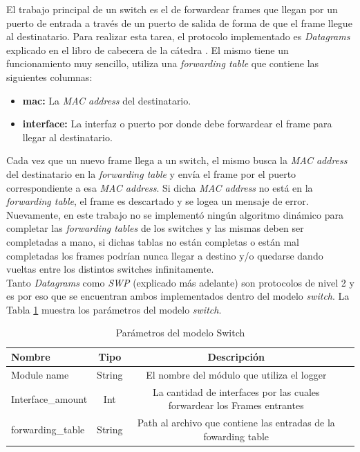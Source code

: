 \documentclass[10pt,a4paper]{article}
\begin{document}
El trabajo principal de un switch es el de forwardear frames que llegan por un puerto de entrada a través de un puerto de salida de forma de que el frame llegue al destinatario. Para realizar esta tarea, el protocolo implementado es \textit{Datagrams} explicado en el libro de cabecera de la cátedra \cite[p.~172]{peterson2011computer}. El mismo tiene un funcionamiento muy sencillo, utiliza una \textit{forwarding table} que contiene las siguientes columnas: \\

\begin{itemize}
\item \textbf{mac: } La \textit{MAC address} del destinatario.
\item \textbf{interface: } La interfaz o puerto por donde debe forwardear el frame para llegar al destinatario.
\end{itemize}

Cada vez que un nuevo frame llega a un switch, el mismo busca la \textit{MAC address} del destinatario en la \textit{forwarding table} y envía el frame por el puerto correspondiente a esa \textit{MAC address}. Si dicha \textit{MAC address} no está en la \textit{forwarding table}, el frame es descartado y se logea un mensaje de error. \\

Nuevamente, en este trabajo no se implementó ningún algoritmo dinámico para completar las \textit{forwarding tables} de los switches y las mismas deben ser completadas a mano, si dichas tablas no están completas o están mal completadas los frames podrían nunca llegar a destino y/o quedarse dando vueltas entre los distintos switches infinitamente. \\

Tanto \textit{Datagrams} como \textit{SWP} (explicado más adelante) son protocolos de nivel 2 y es por eso que se encuentran ambos implementados dentro del modelo \textit{switch}. La Tabla \ref{table: parameters datagrams} muestra los parámetros del modelo \textit{switch}.

\begin{table}[h]
\begin{tabular}{|l|c|c|c|}
  \hline
  \textbf{Nombre} & \textbf{Tipo} & \textbf{Descripción} \\
  \hline
  Module name & String & El nombre del módulo que utiliza el logger \\
  \hline
  Interface\_amount & Int & La cantidad de interfaces por las cuales forwardear los Frames entrantes \\
  \hline
  forwarding\_table & String & Path al archivo que contiene las entradas de la fowarding table \\
  \hline
\end{tabular}
\caption{Parámetros del modelo Switch}
\label{table: parameters datagrams}
\end{table}
\end{document}
